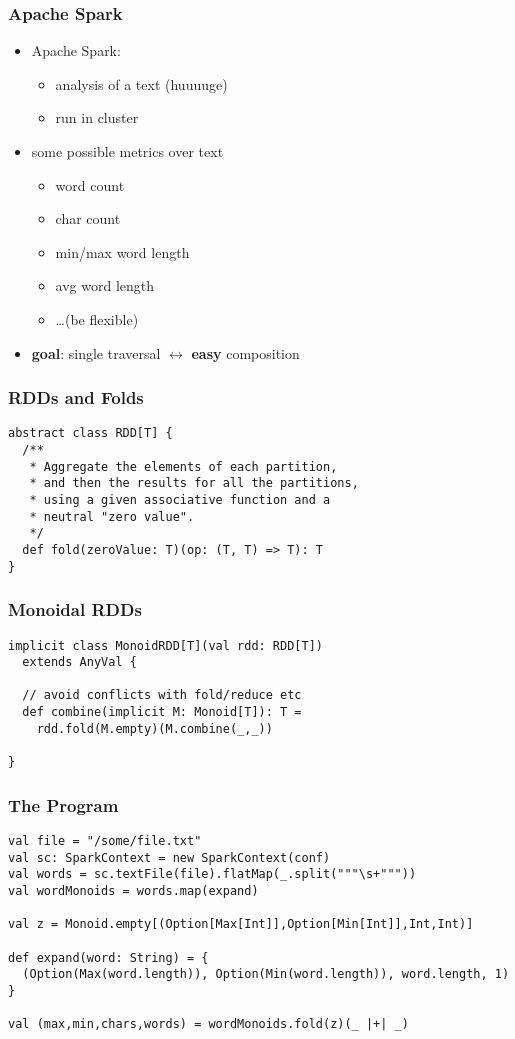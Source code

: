 \documentclass{beamer}
\begin{document}
\begin{frame}
  \frametitle{Apache Spark}
  \begin{itemize}
  \item Apache Spark:
    \begin{itemize}
    \item analysis of a text (huuuuge)
    \item run in cluster
    \end{itemize}
  \item some possible metrics over text
    \begin{itemize}
    \item word count
    \item char count
    \item min/max word length
    \item avg word length
    \item \dots (be flexible)
    \end{itemize}
  \item \textbf{goal}: single traversal $\leftrightarrow$ \textbf{easy} composition
  \end{itemize}
\end{frame}

\begin{frame}[fragile]
  \frametitle{RDDs and Folds}
\begin{verbatim}
abstract class RDD[T] {
  /**
   * Aggregate the elements of each partition,
   * and then the results for all the partitions,
   * using a given associative function and a
   * neutral "zero value".
   */
  def fold(zeroValue: T)(op: (T, T) => T): T
}
\end{verbatim}
\end{frame}

\begin{frame}[fragile]
  \frametitle{Monoidal RDDs}
\begin{verbatim}
implicit class MonoidRDD[T](val rdd: RDD[T])
  extends AnyVal {

  // avoid conflicts with fold/reduce etc
  def combine(implicit M: Monoid[T]): T =
    rdd.fold(M.empty)(M.combine(_,_))

}
\end{verbatim}
\end{frame}

\begin{frame}
  \frametitle{The Program}
\begin{verbatim}
val file = "/some/file.txt"
val sc: SparkContext = new SparkContext(conf)
val words = sc.textFile(file).flatMap(_.split("""\s+"""))
val wordMonoids = words.map(expand)

val z = Monoid.empty[(Option[Max[Int]],Option[Min[Int]],Int,Int)]

def expand(word: String) = {
  (Option(Max(word.length)), Option(Min(word.length)), word.length, 1)
}

val (max,min,chars,words) = wordMonoids.fold(z)(_ |+| _)
\end{verbatim}
\end{frame}
\end{document}
